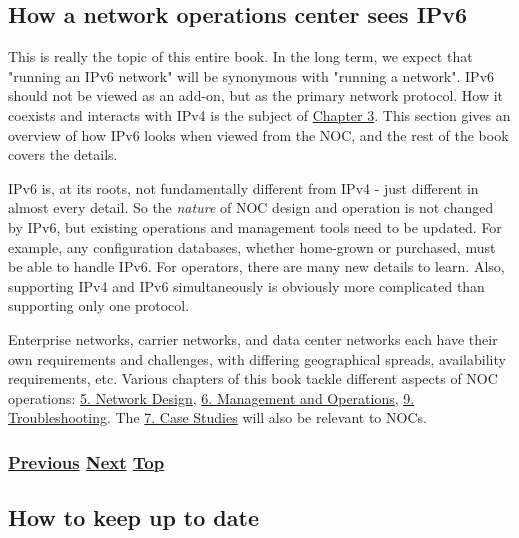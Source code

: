 \documentclass[
]{article}
\begin{document}
\pagebreak

\subsection{How a network operations center sees
IPv6}\label{how-a-network-operations-center-sees-ipv6}

This is really the topic of this entire book. In the long term, we
expect that "running an IPv6 network" will be synonymous with "running a
network". IPv6 should not be viewed as an add-on, but as the primary
network protocol. How it coexists and interacts with IPv4 is the subject
of
\href{https://github.com/becarpenter/book6/tree/main/3.\%20Coexistence\%20with\%20legacy\%20IPv4}{Chapter
3}. This section gives an overview of how IPv6 looks when viewed from
the NOC, and the rest of the book covers the details.

IPv6 is, at its roots, not fundamentally different from IPv4 - just
different in almost every detail. So the \emph{nature} of NOC design and
operation is not changed by IPv6, but existing operations and management
tools need to be updated. For example, any configuration databases,
whether home-grown or purchased, must be able to handle IPv6. For
operators, there are many new details to learn. Also, supporting IPv4
and IPv6 simultaneously is obviously more complicated than supporting
only one protocol.

Enterprise networks, carrier networks, and data center networks each
have their own requirements and challenges, with differing geographical
spreads, availability requirements, etc. Various chapters of this book
tackle different aspects of NOC operations: \hyperref[network-design]{5.
Network Design}, \hyperref[management-and-operations]{6. Management and
Operations}, \hyperref[troubleshooting]{9. Troubleshooting}. The
\hyperref[case-studies]{7. Case Studies} will also be relevant to NOCs.

\subsubsection{\texorpdfstring{\hyperref[how-an-application-programmer-sees-ipv6]{Previous}
\hyperref[how-to-keep-up-to-date]{Next}
\hyperref[introduction-and-foreword]{Top}}{Previous Next Top}}\label{previous-next-top-3}

\pagebreak

\subsection{How to keep up to date}\label{how-to-keep-up-to-date}
\end{document}
